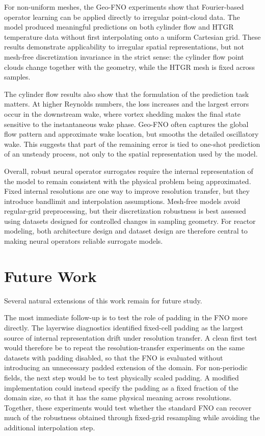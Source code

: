 For non-uniform meshes, the Geo-FNO experiments show that Fourier-based operator learning can be applied directly to irregular point-cloud data. The model produced meaningful predictions on both cylinder flow and HTGR temperature data without first interpolating onto a uniform Cartesian grid. These results demonstrate applicability to irregular spatial representations, but not mesh-free discretization invariance in the strict sense: the cylinder flow point clouds change together with the geometry, while the HTGR mesh is fixed across samples.

The cylinder flow results also show that the formulation of the prediction task matters. At higher Reynolds numbers, the loss increases and the largest errors occur in the downstream wake, where vortex shedding makes the final state sensitive to the instantaneous wake phase. Geo-FNO often captures the global flow pattern and approximate wake location, but smooths the detailed oscillatory wake. This suggests that part of the remaining error is tied to one-shot prediction of an unsteady process, not only to the spatial representation used by the model.

Overall, robust neural operator surrogates require the internal representation of the model to remain consistent with the physical problem being approximated. Fixed internal resolutions are one way to improve resolution transfer, but they introduce bandlimit and interpolation assumptions. Mesh\hyp{}free models avoid regular\hyp{}grid preprocessing, but their discretization robustness is best assessed using datasets designed for controlled changes in sampling geometry. For reactor modeling, both architecture design and dataset design are therefore central to making neural operators reliable surrogate models.

\section{Future Work}

Several natural extensions of this work remain for future study.

The most immediate follow-up is to test the role of padding in the FNO more directly. The layerwise diagnostics identified fixed-cell padding as the largest source of internal representation drift under resolution transfer. A clean first test would therefore be to repeat the resolution-transfer experiments on the same datasets with padding disabled, so that the FNO is evaluated without introducing an unnecessary padded extension of the domain. For non-periodic fields, the next step would be to test physically scaled padding. A modified implementation could instead specify the padding as a fixed fraction of the domain size, so that it has the same physical meaning across resolutions. Together, these experiments would test whether the standard FNO can recover much of the robustness obtained through fixed-grid resampling while avoiding the additional interpolation step.

